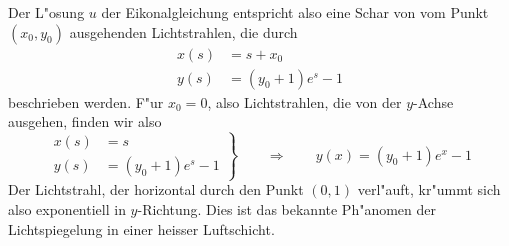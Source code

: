\begin{loesung}
Der L"osung $u$ der Eikonalgleichung entspricht also eine Schar
von
vom Punkt $(x_0,y_0)$ ausgehenden
Lichtstrahlen, die
durch
\begin{align*}
x(s)&=s+x_0\\
y(s)&=(y_0+1)e^s-1
\end{align*}
beschrieben werden. F"ur $x_0=0$, also Lichtstrahlen, die von der
$y$-Achse ausgehen, finden wir also
\begin{equation}
\left.
\begin{aligned}
x(s)&=s\\
y(s)&=(y_0+1)e^s-1
\end{aligned}
\right\}
\qquad\Rightarrow\qquad
y(x)=(y_0+1)e^x-1
\end{equation}
Der Lichtstrahl, der horizontal durch den Punkt $(0,1)$ verl"auft,
kr"ummt sich also exponentiell in $y$-Richtung.
Dies ist das bekannte Ph"anomen der Lichtspiegelung in einer
heisser Luftschicht.
\end{loesung}
